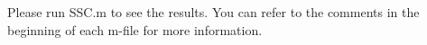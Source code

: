 Please run SSC.m to see the results.
You can refer to the comments in the beginning of each m-file for more information.